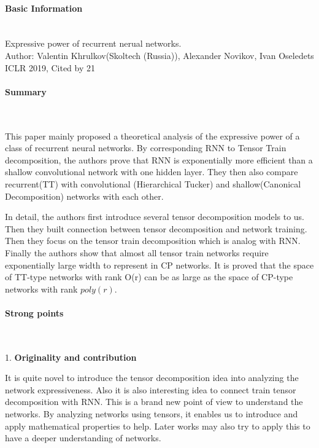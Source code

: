 \documentclass{article}
\begin{document}
\thispagestyle{empty}

\paragraph{Basic Information}  \ \\
Expressive power of recurrent nerual networks. \\
Author: Valentin Khrulkov(Skoltech (Russia)), Alexander Novikov, Ivan Oseledets \\
ICLR 2019, Cited by 21

\paragraph{Summary}  \  

This paper mainly proposed a theoretical analysis of the expressive power of a class of recurrent neural networks. By corresponding RNN to Tensor Train decomposition, the authors prove that RNN is exponentially more efficient than a shallow convolutional network with one hidden layer. They then also compare recurrent(TT) with convolutional (Hierarchical Tucker) and shallow(Canonical Decomposition) networks with each other. 

In detail, the authors first introduce several tensor decomposition models to us. Then they built connection between tensor decomposition and network training. Then they focus on the tensor train decomposition which is analog with RNN. Finally the authors show that almost all tensor train networks require exponentially large width to represent in CP networks. It is proved that the space of TT-type networks with rank O(r)  can be as large as the space of CP-type networks with rank $poly(r)$.

\paragraph{Strong points}  \  

1. \textbf{Originality and contribution}   

It is quite novel to introduce the tensor decomposition idea into analyzing the network expressiveness. Also it is also interesting idea to connect train tensor decomposition with RNN. This is a brand new point of view to understand the networks. By analyzing networks using tensors, it enables us to introduce and apply mathematical properties to help. Later works may also try to apply this to have a deeper understanding of networks.
\end{document}
